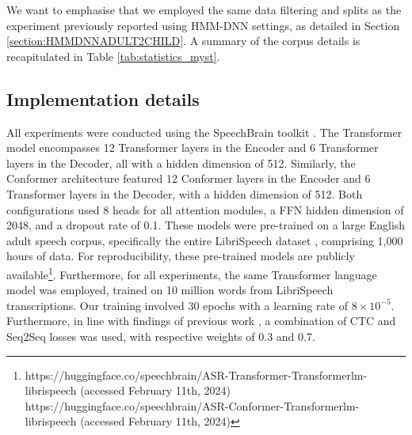 We want to emphasise that we employed the same data filtering and splits as the experiment previously reported using \ac{HMM-DNN} settings, as detailed in Section \ref{section:HMMDNNADULT2CHILD}. A summary of the corpus details is recapitulated in Table \ref{tab:statistics_myst}.

\subsection{Implementation details}
\label{section:TransformerConformerDetails}
All experiments were conducted using the SpeechBrain toolkit \cite{speechbrain}. The Transformer model encompasses 12 Transformer layers in the Encoder and 6 Transformer layers in the Decoder, all with a hidden dimension of 512. Similarly, the Conformer architecture featured 12 Conformer layers in the Encoder and 6 Transformer layers in the Decoder, with a hidden dimension of 512. Both configurations used 8 heads for all attention modules, a \ac{FFN} hidden dimension of 2048, and a dropout rate of 0.1. These models were pre-trained on a large English adult speech corpus, specifically the entire LibriSpeech dataset \cite{librispeech}, comprising 1,000 hours of data. For reproducibility, these pre-trained models are publicly available\footnote{https://huggingface.co/speechbrain/ASR-Transformer-Transformerlm-librispeech (accessed February 11th, 2024)\\ https://huggingface.co/speechbrain/ASR-Conformer-Transformerlm-librispeech (accessed February 11th, 2024)}. Furthermore, for all experiments, the same Transformer language model was employed, trained on 10 million words from LibriSpeech transcriptions. Our training involved 30 epochs with a learning rate of $8 \times 10^{-5}$. Furthermore, in line with findings of previous work \cite{gelin2021endtoend}, a combination of \ac{CTC} and \ac{Seq2Seq} losses was used, with respective weights of 0.3 and 0.7.


